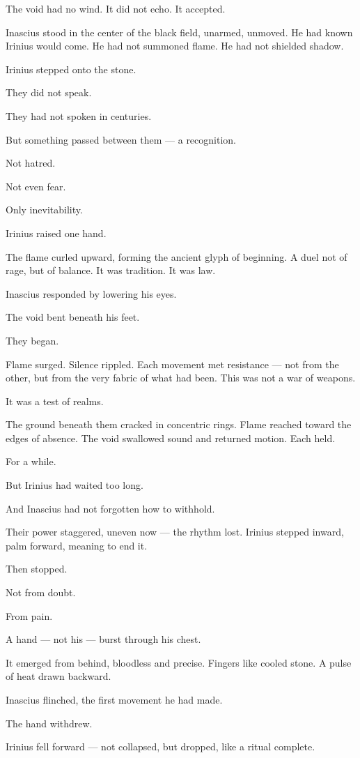 \documentclass[12pt]{article}
\begin{document}
The void had no wind. It did not echo. It accepted.

Inascius stood in the center of the black field, unarmed, unmoved. He had known Irinius would come. He had not summoned flame. He had not shielded shadow.

Irinius stepped onto the stone.

They did not speak.

They had not spoken in centuries.

But something passed between them — a recognition.

Not hatred.

Not even fear.

Only inevitability.

Irinius raised one hand.

The flame curled upward, forming the ancient glyph of beginning. A duel not of rage, but of balance. It was tradition. It was law.

Inascius responded by lowering his eyes.

The void bent beneath his feet.

They began.

Flame surged. Silence rippled. Each movement met resistance — not from the other, but from the very fabric of what had been. This was not a war of weapons.

It was a test of realms.

The ground beneath them cracked in concentric rings. Flame reached toward the edges of absence. The void swallowed sound and returned motion. Each held.

For a while.

But Irinius had waited too long.

And Inascius had not forgotten how to withhold.

Their power staggered, uneven now — the rhythm lost. Irinius stepped inward, palm forward, meaning to end it.

Then stopped.

Not from doubt.

From pain.

A hand — not his — burst through his chest.

It emerged from behind, bloodless and precise. Fingers like cooled stone. A pulse of heat drawn backward.

Inascius flinched, the first movement he had made.

The hand withdrew.

Irinius fell forward — not collapsed, but dropped, like a ritual complete.
\end{document}
